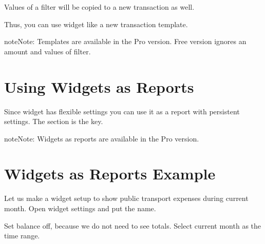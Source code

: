 \documentclass[a4paper,10pt,english]{sphinxmanual}
\begin{document}
\sphinxAtStartPar
Values of a filter will be copied to a new transaction as well.

\sphinxAtStartPar
Thus, you can use widget like a new transaction template.

\begin{sphinxadmonition}{note}{Note:}
\sphinxAtStartPar
Templates are available in the Pro version. Free version ignores an amount and values of filter.
\end{sphinxadmonition}


\section{Using Widgets as Reports}
\label{\detokenize{widgets:using-widgets-as-reports}}
\sphinxAtStartPar
Since widget has flexible settings you can use it as a report with persistent settings. The
 section is the key.

\begin{sphinxadmonition}{note}{Note:}
\sphinxAtStartPar
Widgets as reports are available in the Pro version.
\end{sphinxadmonition}


\section{Widgets as Reports Example}
\label{\detokenize{widgets:widgets-as-reports-example}}
\sphinxAtStartPar
Let us make a widget setup to show public transport expenses during current month.
Open widget settings and put the  name.

\noindent{}

\noindent{}

\noindent{}

\sphinxAtStartPar
Set balance off, because we do not need to see totals. Select current month as the time range.

\noindent{}

\noindent{}

\noindent{}
\end{document}
